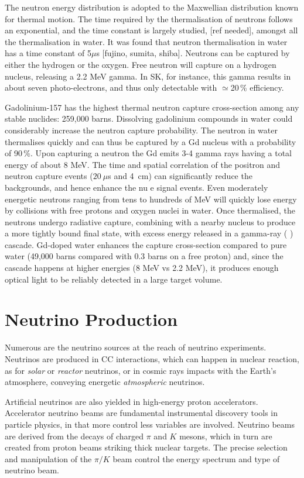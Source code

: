  The neutron energy distribution is adopted to the Maxwellian distribution known for thermal motion.
 The time required by the thermalisation of neutrons follows an exponential, and the time constant is largely %
 studied, [ref needed], amongst all the thermalisation in water.
 It was found that neutron thermalisation in water has a time constant of 5$\mu$s [fujino, sumita, shiba].
 Neutrons can be captured by either the hydrogen or the oxygen.
 Free neutron will capture on a hydrogen nucleus, releasing a 2.2 MeV gamma.
 In SK, for instance, this gamma results in about seven photo-electrons, and thus only detectable with $\simeq$20\,\% %
 efficiency.

 Gadolinium-157 has the highest thermal neutron capture cross-section among any stable %
 nuclides: 259,000 barns.
 Dissolving gadolinium compounds in water could considerably increase the neutron capture probability.
 The neutron in water thermalises quickly and can thus be captured by a Gd nucleus with a probability of 90\,\%.
 Upon capturing a neutron the Gd emits 3-4 gamma rays having a total energy of about 8 MeV.
 The time and spatial correlation of the positron and neutron capture events ($20~\mu$s and 4~cm) %
 can significantly reduce the backgrounds, and hence enhance the nu e signal events.
 Even moderately energetic neutrons ranging from tens to hundreds of MeV will quickly lose energy %
 by collisions with free protons and oxygen nuclei in water. 
 Once thermalised, the neutrons undergo radiative capture, combining with a nearby nucleus to %
 produce a more tightly bound final state, with excess energy released in a gamma-ray ( ) cascade. 
 Gd-doped water enhances the capture cross-section compared to pure water %
 (49,000 barns compared with 0.3 barns on a free proton) and, since the cascade happens %
 at higher energies (8 MeV vs 2.2 MeV), it produces enough optical light to be reliably detected in %
 a large target volume.


 \section{Neutrino Production}

 Numerous are the neutrino sources at the reach of neutrino experiments.
 Neutrinos are produced in CC interactions, which can happen in nuclear reaction, as for \emph{solar} %
 or \emph{reactor} neutrinos, or in cosmic rays impacts with the Earth's atmosphere, %
 conveying energetic \emph{atmospheric} neutrinos.

 Artificial neutrinos are also yielded in high-energy proton accelerators.
 Accelerator neutrino beams are fundamental instrumental discovery tools in particle physics, in that more control %
 less variables are involved.
 Neutrino beams are derived from the decays of charged $\pi$ and $K$ mesons, which in turn are created from %
 proton beams striking thick nuclear targets.
 The precise selection and manipulation of the $\pi/K$ beam control the energy spectrum and type of neutrino beam.
 
